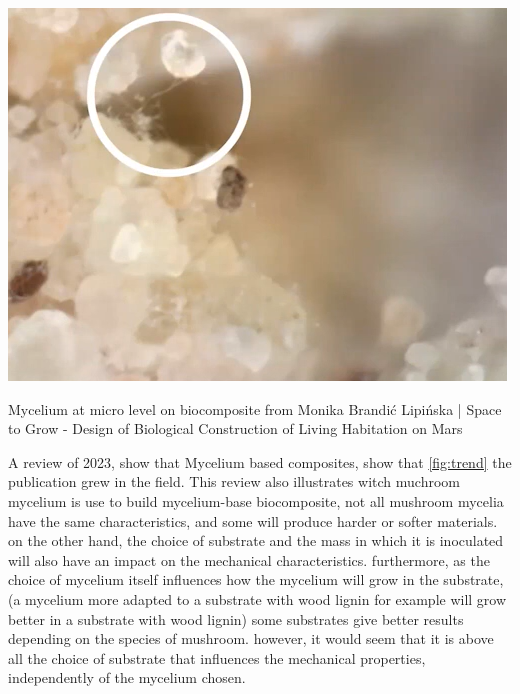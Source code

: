 \begin{marginfigure}
    \centering
    \includegraphics{images/bond-mycelium.png}    
    \caption{Mycelium at micro level on biocomposite from  Monika Brandić Lipińska | Space to Grow - Design of Biological Construction of Living Habitation on Mars}
    \label{fig:myco-bond}
\end{marginfigure}

A review of 2023\cite{alaneme2023mycelium}, show that Mycelium based composites, show that \ref{fig:trend} the publication grew in the field.
This review also illustrates witch muchroom mycelium is use to build mycelium-base biocomposite, not all mushroom mycelia have the same characteristics, and some will produce harder or softer materials. on the other hand, the choice of substrate and the mass in which it is inoculated will also have an impact on the mechanical characteristics. furthermore, as the choice of mycelium itself influences how the mycelium will grow in the substrate, (a mycelium more adapted to a substrate with wood lignin for example will grow better in a substrate with wood lignin) some substrates give better results depending on the species of mushroom. 
however, it would seem that it is above all the choice of substrate that influences the mechanical properties, independently of the mycelium chosen.  

